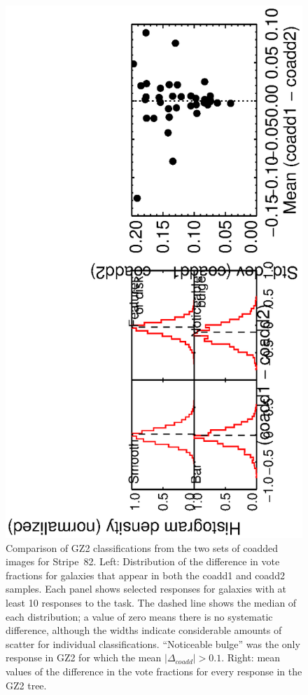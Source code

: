 \documentclass[useAMS,usenatbib]{mn2e}
\begin{document}
\begin{figure}
\includegraphics[angle=-90,width=7.0in]{figures/stripe82_coadd_compare.ps}
\caption{Comparison of GZ2 classifications from the two sets of coadded images for Stripe~82. Left: Distribution of the difference in vote fractions for galaxies that appear in both the coadd1 and coadd2 samples. Each panel shows selected responses for galaxies with at least 10 responses to the task. The dashed line shows the median of each distribution; a value of zero means there is no systematic difference, although the widths indicate considerable amounts of scatter for individual classifications. ``Noticeable bulge'' was the only response in GZ2 for which the mean $|\Delta_{coadd}| > 0.1$. Right: mean values of the difference in the vote fractions for every response in the GZ2 tree. 
\label{fig-stripe82_compare}}
\end{figure}
\end{document}
